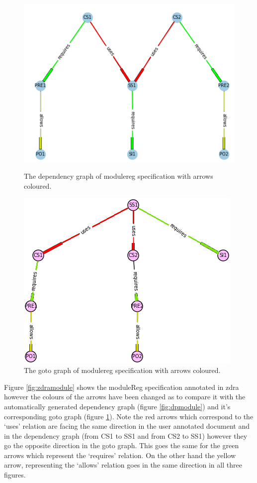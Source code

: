 \begin{figure}[H]
\centering
\begin{minipage}{0.47\textwidth}
\centering
\includegraphics[scale=0.55]{Figures/Formalising/dpmodule.png}
\caption{The dependency graph of modulereg specification with arrows coloured.  \label{fig:dpmodule}}
\end{minipage}\hfill
\begin{minipage}{0.47\textwidth}
\centering
\includegraphics[scale=0.55]{Figures/Formalising/gotomodule.png}
\caption{The goto graph of modulereg specification with arrows coloured. \label{fig:gotomodule}}
\end{minipage}
\end{figure}

Figure \ref{fig:zdramodule} shows the moduleReg specification annotated in
\gls{zdra} however the colours of the arrows have been changed as to compare it
with the automatically generated dependency graph (figure \ref{fig:dpmodule})
and it's corresponding goto graph (figure \ref{fig:gotomodule}). Note the red
arrows which correspond to the `uses' relation are facing the same direction in
the user annotated document and in the dependency graph (from CS1 to SS1 and
from CS2 to SS1) however they go the opposite direction in the goto graph. This
goes the same for the green arrows which represent the `requires' relation. On
the other hand the yellow arrow, representing the `allows' relation goes in the
same direction in all three figures.

